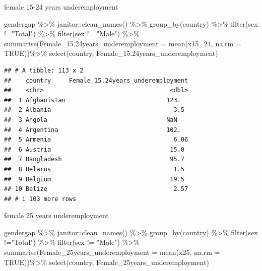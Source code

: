 \documentclass[
]{article}
\newenvironment{Shaded}{\begin{snugshade}}{\end{snugshade}}
\newcommand{\AttributeTok}[1]{\textcolor[rgb]{0.77,0.63,0.00}{#1}}
\newcommand{\ConstantTok}[1]{\textcolor[rgb]{0.00,0.00,0.00}{#1}}
\newcommand{\FloatTok}[1]{\textcolor[rgb]{0.00,0.00,0.81}{#1}}
\newcommand{\FunctionTok}[1]{\textcolor[rgb]{0.00,0.00,0.00}{#1}}
\newcommand{\NormalTok}[1]{#1}
\newcommand{\SpecialCharTok}[1]{\textcolor[rgb]{0.00,0.00,0.00}{#1}}
\newcommand{\StringTok}[1]{\textcolor[rgb]{0.31,0.60,0.02}{#1}}
\begin{document}
female 15-24 years underemployment

\begin{Shaded}
\begin{Highlighting}[]
\NormalTok{gendergap }\SpecialCharTok{\%\textgreater{}\%}
\NormalTok{  janitor}\SpecialCharTok{::}\FunctionTok{clean\_names}\NormalTok{() }\SpecialCharTok{\%\textgreater{}\%}
  \FunctionTok{group\_by}\NormalTok{(country) }\SpecialCharTok{\%\textgreater{}\%}
  \FunctionTok{filter}\NormalTok{(sex }\SpecialCharTok{!=}\StringTok{"Total"}\NormalTok{) }\SpecialCharTok{\%\textgreater{}\%}
  \FunctionTok{filter}\NormalTok{(sex }\SpecialCharTok{!=} \StringTok{"Male"}\NormalTok{) }\SpecialCharTok{\%\textgreater{}\%}
  \FunctionTok{summarise}\NormalTok{(}\AttributeTok{Female\_15.24years\_underemployment =} \FunctionTok{mean}\NormalTok{(x15\_24, }\AttributeTok{na.rm =} \ConstantTok{TRUE}\NormalTok{))}\SpecialCharTok{\%\textgreater{}\%}
  \FunctionTok{select}\NormalTok{(country, Female\_15}\FloatTok{.24}\NormalTok{years\_underemployment)}
\end{Highlighting}
\end{Shaded}

\begin{verbatim}
## # A tibble: 113 x 2
##    country     Female_15.24years_underemployment
##    <chr>                                   <dbl>
##  1 Afghanistan                            123.  
##  2 Albania                                  3.5 
##  3 Angola                                 NaN   
##  4 Argentina                              102.  
##  5 Armenia                                  6.06
##  6 Austria                                 15.0 
##  7 Bangladesh                              95.7 
##  8 Belarus                                  1.5 
##  9 Belgium                                 19.5 
## 10 Belize                                   2.57
## # i 103 more rows
\end{verbatim}

female 25 years underemployment

\begin{Shaded}
\begin{Highlighting}[]
\NormalTok{gendergap }\SpecialCharTok{\%\textgreater{}\%}
\NormalTok{  janitor}\SpecialCharTok{::}\FunctionTok{clean\_names}\NormalTok{() }\SpecialCharTok{\%\textgreater{}\%}
  \FunctionTok{group\_by}\NormalTok{(country) }\SpecialCharTok{\%\textgreater{}\%}
  \FunctionTok{filter}\NormalTok{(sex }\SpecialCharTok{!=}\StringTok{"Total"}\NormalTok{) }\SpecialCharTok{\%\textgreater{}\%}
  \FunctionTok{filter}\NormalTok{(sex }\SpecialCharTok{!=} \StringTok{"Male"}\NormalTok{) }\SpecialCharTok{\%\textgreater{}\%}
  \FunctionTok{summarise}\NormalTok{(}\AttributeTok{Female\_25years\_underemployment =} \FunctionTok{mean}\NormalTok{(x25, }\AttributeTok{na.rm =} \ConstantTok{TRUE}\NormalTok{))}\SpecialCharTok{\%\textgreater{}\%}
  \FunctionTok{select}\NormalTok{(country, Female\_25years\_underemployment)}
\end{Highlighting}
\end{Shaded}
\end{document}
